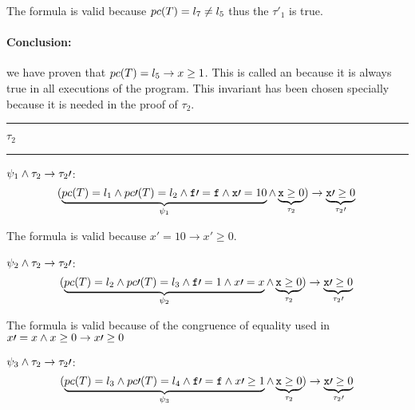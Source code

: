 	The formula is valid because $pc(T) = l_7 \neq l_5$ thus the $\tau\prime _1$ is true.


\paragraph{Conclusion:} we have proven that $pc(T) = l_5 \to x \geq 1$. 
%
This is called an  because it is always true in all executions of the program. 
%
This invariant has been chosen specially because it is needed in the proof of $\tau_2$.

\begin{center}\rule{4cm}{0.4pt}  $\tau_2$  \rule{4cm}{0.4pt}\end{center}

	\; $\psi_1 \wedge \tau_2 \to \tau_2\prime $:	
	\begin{equation*}
		(
			\underbrace{pc(T) = l_1 \wedge pc\prime (T) = l_2 \wedge \mathtt{f\prime =f} \wedge \mathtt{x}\prime  = 10}_{\psi_1} \wedge \underbrace{\mathtt{x} \geq 0}_{\tau_2}
		) 
				\to  \underbrace{\mathtt{x}\prime  \geq 0}_{\tau_2\prime }\\\\
	\end{equation*}


	The formula is valid because $x\prime =10 \to x\prime \geq 0$.

	\; $\psi_2 \wedge \tau_2 \to \tau_2\prime $:	
	\begin{equation*}
		(
			\underbrace{pc(T) = l_2 \wedge pc\prime (T) = l_3 \wedge \mathtt{f}\prime  = 1 \wedge x\prime =x}_{\psi_2} \wedge \underbrace{\mathtt{x} \geq 0}_{\tau_2}
		) 
			\to \underbrace{\mathtt{x}\prime  \geq 0}_{\tau_2\prime }\\\\
	\end{equation*}



	The formula is valid because of the congruence of equality used in  $x\prime =x \wedge x\geq 0 \to x\prime \geq 0$ 

	\; $\psi_3 \wedge \tau_2 \to \tau_2\prime $:
	\begin{equation*}
		(
			\underbrace{pc(T) = l_3 \wedge pc\prime (T) = l_4 \wedge \mathtt{f\prime =f} \wedge x\prime \geq 1}_{\psi_3} \wedge \underbrace{\mathtt{x} \geq 0}_{\tau_2}
		) 
			\to \underbrace{\mathtt{x}\prime  \geq 0}_{\tau_2\prime }\\\\
	\end{equation*}



